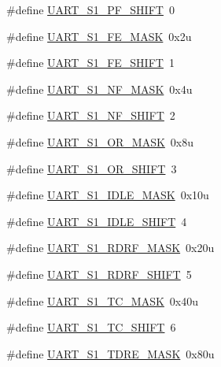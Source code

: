 \begin{DoxyCompactItemize}
\item 
\#define \hyperlink{group___u_a_r_t___register___masks_ga79ce3db2e0a8eaa687b01942adf36468}{U\+A\+R\+T\+\_\+\+S1\+\_\+\+P\+F\+\_\+\+S\+H\+I\+FT}~0
\item 
\#define \hyperlink{group___u_a_r_t___register___masks_ga83b62a5246fdb7f0aaaffb92074c9e0f}{U\+A\+R\+T\+\_\+\+S1\+\_\+\+F\+E\+\_\+\+M\+A\+SK}~0x2u
\item 
\#define \hyperlink{group___u_a_r_t___register___masks_ga2795a7498ce3e3d09703c4cec6378531}{U\+A\+R\+T\+\_\+\+S1\+\_\+\+F\+E\+\_\+\+S\+H\+I\+FT}~1
\item 
\#define \hyperlink{group___u_a_r_t___register___masks_gadfaa4f856facd373c0441b6e89bd87ba}{U\+A\+R\+T\+\_\+\+S1\+\_\+\+N\+F\+\_\+\+M\+A\+SK}~0x4u
\item 
\#define \hyperlink{group___u_a_r_t___register___masks_ga7b2eb195cce2f086cd1b0c136eced375}{U\+A\+R\+T\+\_\+\+S1\+\_\+\+N\+F\+\_\+\+S\+H\+I\+FT}~2
\item 
\#define \hyperlink{group___u_a_r_t___register___masks_gac8102fb901477551dcc8505b3afb5272}{U\+A\+R\+T\+\_\+\+S1\+\_\+\+O\+R\+\_\+\+M\+A\+SK}~0x8u
\item 
\#define \hyperlink{group___u_a_r_t___register___masks_ga34422d4914b457201229c9e14c74ced6}{U\+A\+R\+T\+\_\+\+S1\+\_\+\+O\+R\+\_\+\+S\+H\+I\+FT}~3
\item 
\#define \hyperlink{group___u_a_r_t___register___masks_gac1b555f14295616d01152013fe7704b9}{U\+A\+R\+T\+\_\+\+S1\+\_\+\+I\+D\+L\+E\+\_\+\+M\+A\+SK}~0x10u
\item 
\#define \hyperlink{group___u_a_r_t___register___masks_gaf3efb8b468c18b3060dfc91b94256f82}{U\+A\+R\+T\+\_\+\+S1\+\_\+\+I\+D\+L\+E\+\_\+\+S\+H\+I\+FT}~4
\item 
\#define \hyperlink{group___u_a_r_t___register___masks_gab62f7e1b8548b5bbe5686f31c4beae61}{U\+A\+R\+T\+\_\+\+S1\+\_\+\+R\+D\+R\+F\+\_\+\+M\+A\+SK}~0x20u
\item 
\#define \hyperlink{group___u_a_r_t___register___masks_ga346046d0c13d06cc9c382967d1efc56e}{U\+A\+R\+T\+\_\+\+S1\+\_\+\+R\+D\+R\+F\+\_\+\+S\+H\+I\+FT}~5
\item 
\#define \hyperlink{group___u_a_r_t___register___masks_ga8a78686c3c82eeb352b85f0699361558}{U\+A\+R\+T\+\_\+\+S1\+\_\+\+T\+C\+\_\+\+M\+A\+SK}~0x40u
\item 
\#define \hyperlink{group___u_a_r_t___register___masks_ga400fc3dbecf13c75447bbc006c49bdbc}{U\+A\+R\+T\+\_\+\+S1\+\_\+\+T\+C\+\_\+\+S\+H\+I\+FT}~6
\item 
\#define \hyperlink{group___u_a_r_t___register___masks_gaa7d30e83d1a7d0a544393186508a667e}{U\+A\+R\+T\+\_\+\+S1\+\_\+\+T\+D\+R\+E\+\_\+\+M\+A\+SK}~0x80u

\end{DoxyCompactItemize}
